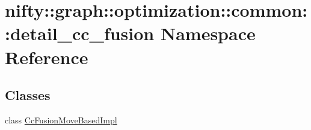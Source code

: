 \hypertarget{namespacenifty_1_1graph_1_1optimization_1_1common_1_1detail__cc__fusion}{}\section{nifty\+:\+:graph\+:\+:optimization\+:\+:common\+:\+:detail\+\_\+cc\+\_\+fusion Namespace Reference}
\label{namespacenifty_1_1graph_1_1optimization_1_1common_1_1detail__cc__fusion}
\subsection*{Classes}
\begin{DoxyCompactItemize}
\item 
class \hyperlink{classnifty_1_1graph_1_1optimization_1_1common_1_1detail__cc__fusion_1_1CcFusionMoveBasedImpl}{Cc\+Fusion\+Move\+Based\+Impl}
\end{DoxyCompactItemize}
